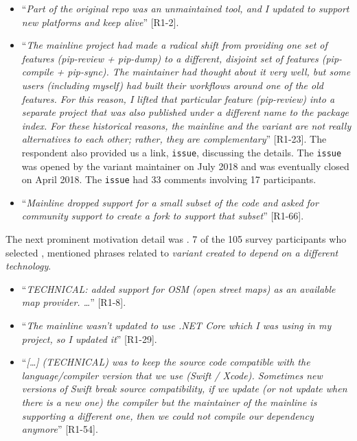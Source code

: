 \begin{itemize}[leftmargin=*]
\item ``\emph{Part of the original repo was an unmaintained tool, and I updated to support new platforms and keep alive}'' [R1-2].
\item ``\emph{The mainline project had made a radical shift from providing one set of features (pip-review + pip-dump) to a different, disjoint set of features (pip-compile + pip-sync). The maintainer had thought about it very well, but some users (including myself) had built their workflows around one of the old features. For this reason, I lifted that particular feature (pip-review) into a separate project that was also published under a different name to the package index. For these historical reasons, the mainline and the variant are not really alternatives to each other; rather, they are complementary}'' [R1-23]. The respondent also provided us a link, \gh \texttt{issue}, discussing the details. The \texttt{issue} was opened by the variant maintainer on July 2018 and was eventually closed on April 2018. The \texttt{issue} had 33 comments involving 17 participants. %

\item ``\textit{Mainline dropped support for a small subset of the code and asked for community support to create a fork to support that subset}'' [R1-66].
\end{itemize}

\nd The next prominent  motivation detail was .
7 of the 105 survey participants who selected , mentioned phrases related to \emph{variant created to depend on a different technology}.

\begin{itemize}[leftmargin=*]
\item ``\emph{TECHNICAL: added support for OSM (open street maps) as an available map provider. \ldots}'' [R1-8].
\item ``\emph{The mainline wasn't updated to use .NET Core which I was using in my project, so I updated it}'' [R1-29].
\item ``\emph{[\dots] (TECHNICAL) was to keep the source code compatible with the language/compiler version that we use (Swift / Xcode). Sometimes new versions of Swift break source compatibility, if we update (or not update when there is a new one) the compiler but the maintainer of the mainline is supporting a different one, then we could not compile our dependency anymore}'' [R1-54].
\end{itemize}

